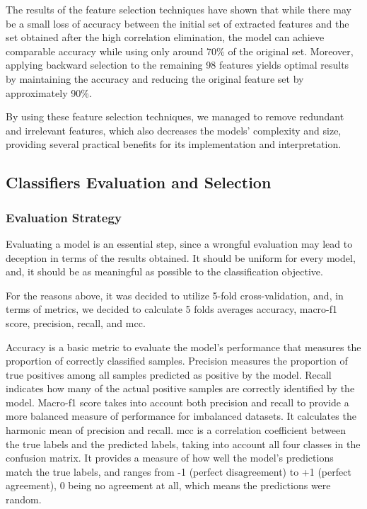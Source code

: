 The results of the feature selection techniques have shown that while there may be a small loss of accuracy between the initial set of extracted features and the set obtained after the high correlation elimination, the model can achieve comparable accuracy while using only around 70\% of the original set. Moreover, applying backward selection to the remaining 98 features yields optimal results by maintaining the accuracy and reducing the original feature set by approximately 90\%.

By using these feature selection techniques, we managed to remove redundant and irrelevant features, which also decreases the models' complexity and size, providing several practical benefits for its implementation and interpretation.


\subsection{Classifiers Evaluation and Selection}

\subsubsection{Evaluation Strategy}

Evaluating a model is an essential step, since a wrongful evaluation may lead to deception in terms of the results obtained. It should be uniform for every model, and, it should be as meaningful as possible to the classification objective.

For the reasons above, it was decided to utilize 5-fold cross-validation, and, in terms of metrics, we decided to calculate 5 folds averages accuracy, macro-f1 score, precision, recall, and \ac{mcc}.

Accuracy is a basic metric to evaluate the model's performance that measures the proportion of correctly classified samples. Precision measures the proportion of true positives among all samples predicted as positive by the model. Recall indicates how many of the actual positive samples are correctly identified by the model. Macro-f1 score takes into account both precision and recall to provide a more balanced measure of performance for imbalanced datasets. It calculates the harmonic mean of precision and recall. \ac{mcc} is a correlation coefficient between the true labels and the predicted labels, taking into account all four classes in the confusion matrix. It provides a measure of how well the model's predictions match the true labels, and ranges from -1 (perfect disagreement) to +1 (perfect agreement), 0 being no agreement at all, which means the predictions were random.


